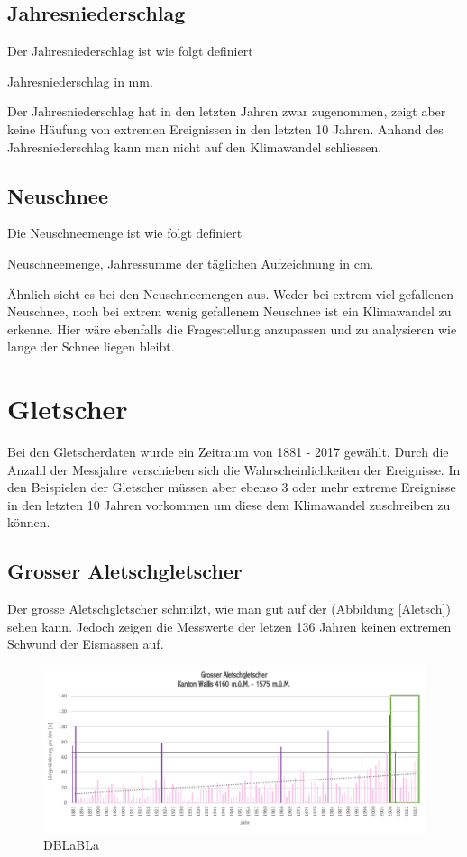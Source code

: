 \begin{refsection}
\subsection{Jahresniederschlag}
Der Jahresniederschlag ist wie folgt definiert

\begin{definition}
Jahresniederschlag in mm.
\end{definition}

Der Jahresniederschlag hat in den letzten Jahren zwar zugenommen, zeigt aber keine Häufung von extremen Ereignissen in den letzten 10 Jahren. Anhand des Jahresniederschlag kann man nicht auf den Klimawandel schliessen.


\subsection{Neuschnee}
Die Neuschneemenge ist wie folgt definiert

\begin{definition}
Neuschneemenge, Jahressumme der täglichen Aufzeichnung in cm.
\end{definition}

Ähnlich sieht es bei den Neuschneemengen aus. Weder bei extrem viel gefallenen Neuschnee, noch bei extrem wenig gefallenem Neuschnee ist ein Klimawandel zu erkenne. Hier wäre ebenfalls die Fragestellung anzupassen und zu analysieren wie lange der Schnee liegen bleibt.


\section{Gletscher}
Bei den Gletscherdaten wurde ein Zeitraum von 1881 - 2017 gewählt. Durch die Anzahl der Messjahre verschieben sich die Wahrscheinlichkeiten der Ereignisse. In den Beispielen der Gletscher müssen aber ebenso 3 oder mehr extreme Ereignisse in den letzten 10 Jahren vorkommen um diese dem Klimawandel zuschreiben zu können.

\subsection{Grosser Aletschgletscher}
Der grosse Aletschgletscher schmilzt, wie man gut auf der (Abbildung \ref{Aletsch}) sehen kann. Jedoch zeigen die Messwerte der letzen 136 Jahren keinen extremen Schwund der Eismassen auf.

\begin{figure}
\centering
\includegraphics[width=1.0\textwidth]{extrem/Aletsch.pdf}
\caption{DBLaBLa}
\label{AletschTab}
\end{figure}


\end{refsection}
